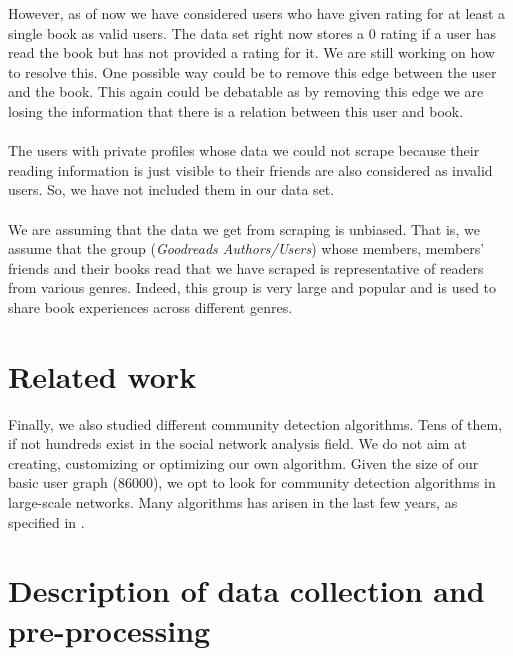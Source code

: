 \documentclass[11pt]{article}
\begin{document}
However, as of now we have considered users who have given rating for at least a single book as valid users. The data set right now stores a 0 rating if a user has read the book but has not provided a rating for it. We are still working on how to resolve this. One possible way could be to remove this edge between the user and the book. This again could be debatable as by removing this edge we are losing the information that there is a relation between this user and book.\\\\
The users with private profiles whose data we could not scrape because their reading information is just visible to their friends are also considered as invalid users. So, we have not included them in our data set.\\\\
We are assuming that the data we get from scraping is unbiased. That is, we assume that the group ({\it Goodreads Authors/Users}) whose members, members' friends and their books read that we have scraped is representative of readers from various genres. Indeed, this group is very large and popular and is used to share book experiences across different genres.

\section{Related work}


Finally, we also studied different community detection algorithms. Tens of them, if not hundreds exist in the social network analysis field. We do not aim at creating, customizing or optimizing our own algorithm. Given the size of our basic user graph ($86000$), we opt to look for community detection algorithms in large-scale networks.
Many algorithms has arisen in the last few years, as specified in \cite{survey}.




\section{Description of data collection and pre-processing}
\label{sec:data_acquisition}
\end{document}
